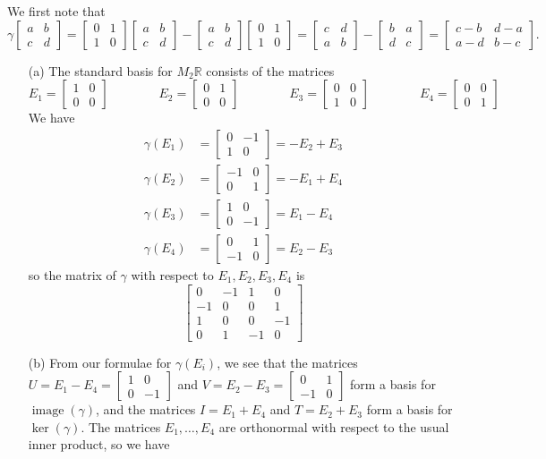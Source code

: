 \documentclass{amsart}
\newcommand{\R}         {{\mathbb{R}}}
\newcommand{\img}       {\operatorname{image}}
\newcommand{\bbm}       {\left[\begin{matrix}}
\newcommand{\ebm}       {\end{matrix}\right]}
\newcommand{\gm}        {\gamma}
\renewcommand{\:}       {\colon}
\theoremstyle{definition}
\renewenvironment{solution}{\SolutionAtEnd}{\endSolutionAtEnd}
\begin{document}
\begin{solution}
 We first note that
 \[ \gm\bbm a&b\\ c&d\ebm =
    \bbm 0&1\\ 1&0\ebm \bbm a&b\\ c&d\ebm -
    \bbm a&b\\ c&d\ebm \bbm 0&1\\ 1&0\ebm =
    \bbm c&d\\ a&b\ebm - \bbm b&a\\ d&c\ebm =
    \bbm c-b & d-a \\ a-d & b-c \ebm.
 \]
 \begin{itemize}
  \item[(a)] The standard basis for $M_2\R$ consists of the
   matrices
   \[ E_1 = \bbm 1&0\\0&0 \ebm \hspace{4em}
      E_2 = \bbm 0&1\\0&0 \ebm \hspace{4em}
      E_3 = \bbm 0&0\\1&0 \ebm \hspace{4em}
      E_4 = \bbm 0&0\\0&1 \ebm
   \]
   We have
   \begin{align*}
    \gm(E_1) &= \bbm 0&-1\\1&0 \ebm = -E_2+E_3 \\
    \gm(E_2) &= \bbm -1&0\\0&1 \ebm = -E_1+E_4 \\
    \gm(E_3) &= \bbm 1&0\\0&-1 \ebm =  E_1-E_4 \\
    \gm(E_4) &= \bbm 0&1\\-1&0 \ebm =  E_2-E_3
   \end{align*}
   so the matrix of $\gm$ with respect to $E_1,E_2,E_3,E_4$ is
   \[ \bbm  0 & -1 &  1 &  0 \\
           -1 &  0 &  0 &  1 \\
            1 &  0 &  0 & -1 \\
            0 &  1 & -1 &  0 \ebm
   \]
  \item[(b)] From our formulae for $\gm(E_i)$, we see that the
   matrices $U=E_1-E_4=\bbm 1&0\\0&-1\ebm$ and
   $V=E_2-E_3=\bbm 0&1\\-1&0\ebm$ form a basis for $\img(\gm)$, and
   the matrices $I=E_1+E_4$ and $T=E_2+E_3$ form a basis for
   $\ker(\gm)$.  The matrices $E_1,\dotsc,E_4$ are orthonormal with
   respect to the usual inner product, so we have

\end{itemize}
\end{solution}
\end{document}
